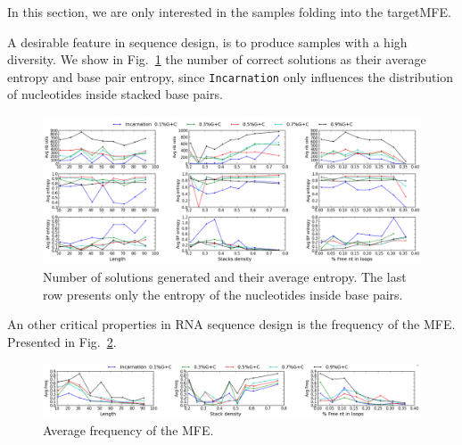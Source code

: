 In this section, we are only interested  in the samples folding into the 
targetMFE. 

A desirable feature in sequence design, is to produce samples with a high
diversity. We show in Fig.~\ref{fig:nb_sols_entropy} the number of correct
solutions as their average entropy and base pair entropy, since \texttt{Incarnation}  only influences the distribution of nucleotides inside stacked base pairs.

\begin{figure}[ht!]
	\centering
	\includegraphics[scale=0.45]{Figures/nb_sols_entropy.png}
	\caption{Number of solutions generated and their average entropy. 
	The last row presents only the entropy of the nucleotides inside base 
	pairs.}
	\label{fig:nb_sols_entropy}
\end{figure}


An other critical properties in RNA sequence design is the frequency of
the MFE. Presented in Fig.~\ref{fig:freq}.

\begin{figure}[ht!]
	\centering
	\includegraphics[scale=0.45]{Figures/freq.png}
	\caption{Average frequency of the MFE.}
	\label{fig:freq}
\end{figure}


